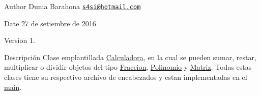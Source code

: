 \begin{DoxyAuthor}{Author}
Dunia Barahona \href{mailto:s4si@hotmail.com}{\tt s4si@hotmail.\+com} 
\end{DoxyAuthor}
\begin{DoxyDate}{Date}
27 de setiembre de 2016 
\end{DoxyDate}
\begin{DoxyVersion}{Version}
1. 
\end{DoxyVersion}
\begin{DoxyParagraph}{Descripción}
Clase emplantillada \hyperlink{class_calculadora}{Calculadora}, en la cual se pueden sumar, restar, multiplicar o dividir objetos del tipo \hyperlink{class_fraccion}{Fraccion}, \hyperlink{class_polinomio}{Polinomio} y \hyperlink{class_matriz}{Matriz}. Todas estas clases tiene su respectivo archivo de encabezados y estan implementadas en el \hyperlink{main_8cpp_a3c04138a5bfe5d72780bb7e82a18e627}{main}. 
\end{DoxyParagraph}
